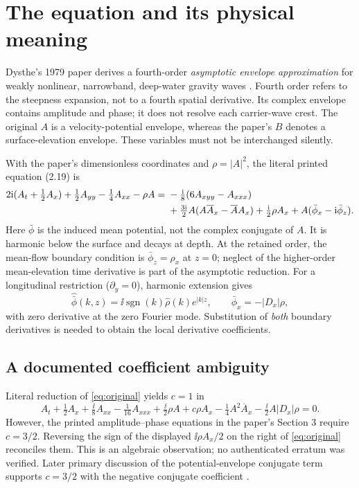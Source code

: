 \section{The equation and its physical meaning}\label{sec:model}
Dysthe's 1979 paper derives a fourth-order \emph{asymptotic envelope approximation} for weakly nonlinear, narrowband, deep-water gravity waves \cite{dysthe}. Fourth order refers to the steepness expansion, not to a fourth spatial derivative. Its complex envelope contains amplitude and phase; it does not resolve each carrier-wave crest. The original $A$ is a velocity-potential envelope, whereas the paper's $B$ denotes a surface-elevation envelope. These variables must not be interchanged silently.

With the paper's dimensionless coordinates and $\rho=|A|^2$, the literal printed equation (2.19) is
\begin{align}
2\mathrm{i}(A_t+\tfrac12A_x)+\tfrac12A_{yy}-\tfrac14A_{xx}-\rho A
={}&-\tfrac{\mathrm{i}}{8}(6A_{xyy}-A_{xxx})\notag\\
&+\tfrac{3\mathrm{i}}{2}A(A\overline{A}_x-\overline{A}A_x)
 +\tfrac{\mathrm{i}}{2}\rho A_x+A(\bar\phi_x-\mathrm{i}\bar\phi_z).
\label{eq:original}
\end{align}
Here $\bar\phi$ is the induced mean potential, not the complex conjugate of $A$. It is harmonic below the surface and decays at depth. At the retained order, the mean-flow boundary condition is $\bar\phi_z=\rho_x$ at $z=0$; neglect of the higher-order mean-elevation time derivative is part of the asymptotic reduction. For a longitudinal restriction ($\partial_y=0$), harmonic extension gives
\[
\widehat{\bar\phi}(k,z)=\ii\operatorname{sgn}(k)\widehat\rho(k)e^{|k|z},
\qquad \bar\phi_x=-|D_x|\rho,
\]
with zero derivative at the zero Fourier mode. Substitution of \emph{both} boundary derivatives is needed to obtain the local derivative coefficients.

\subsection{A documented coefficient ambiguity}
Literal reduction of \eqref{eq:original} yields $c=1$ in
\begin{equation}
 A_t+\tfrac12A_x+\tfrac{\ii}{8}A_{xx}-\tfrac1{16}A_{xxx}
 +\tfrac{\ii}{2}\rho A+c\rho A_x-\tfrac14A^2\overline A_x
 -\tfrac{\ii}{2}A|D_x|\rho=0.\label{eq:temporal}
\end{equation}
However, the printed amplitude--phase equations in the paper's Section 3 require $c=3/2$. Reversing the sign of the displayed $\ii\rho A_x/2$ on the right of \eqref{eq:original} reconciles them. This is an algebraic observation; no authenticated erratum was verified. Later primary discussion of the potential-envelope conjugate term supports $c=3/2$ with the negative conjugate coefficient \cite{shemer,trulsen}.

